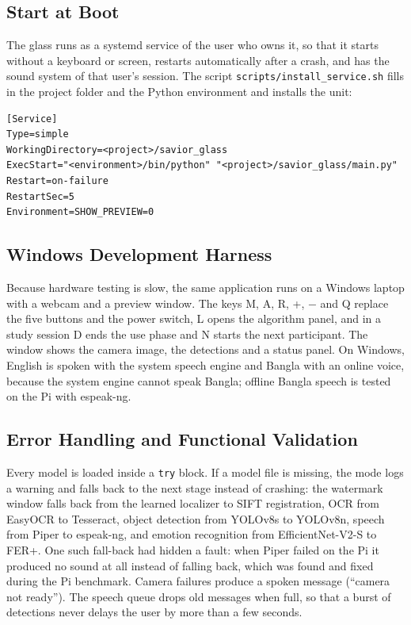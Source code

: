 \subsection*{Start at Boot}
The glass runs as a systemd service of the user who owns it, so that it starts without a keyboard or screen, restarts automatically after a crash, and has the sound system of that user's session. The script \texttt{scripts/install\_service.sh} fills in the project folder and the Python environment and installs the unit:

\begin{lstlisting}
[Service]
Type=simple
WorkingDirectory=<project>/savior_glass
ExecStart="<environment>/bin/python" "<project>/savior_glass/main.py"
Restart=on-failure
RestartSec=5
Environment=SHOW_PREVIEW=0
\end{lstlisting}

\subsection{Windows Development Harness}
Because hardware testing is slow, the same application runs on a Windows laptop with a webcam and a preview window. The keys M, A, R, +, $-$ and Q replace the five buttons and the power switch, L opens the algorithm panel, and in a study session D ends the use phase and N starts the next participant. The window shows the camera image, the detections and a status panel. On Windows, English is spoken with the system speech engine and Bangla with an online voice, because the system engine cannot speak Bangla; offline Bangla speech is tested on the Pi with espeak-ng.

\subsection{Error Handling and Functional Validation}
Every model is loaded inside a \texttt{try} block. If a model file is missing, the mode logs a warning and falls back to the next stage instead of crashing: the watermark window falls back from the learned localizer to SIFT registration, OCR from EasyOCR to Tesseract, object detection from YOLOv8s to YOLOv8n, speech from Piper to espeak-ng, and emotion recognition from EfficientNet-V2-S to FER+. One such fall-back had hidden a fault: when Piper failed on the Pi it produced no sound at all instead of falling back, which was found and fixed during the Pi benchmark. Camera failures produce a spoken message (``camera not ready''). The speech queue drops old messages when full, so that a burst of detections never delays the user by more than a few seconds.

